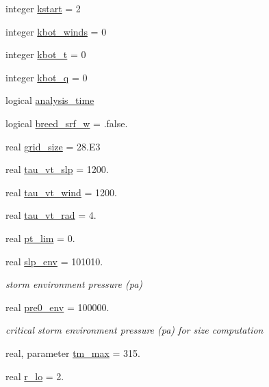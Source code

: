 \begin{DoxyCompactItemize}
integer \hyperlink{classfv__nwp__nudge__mod_ab54932d082a922ed0c64ee023b82cb39}{kstart} = 2
\item 
integer \hyperlink{classfv__nwp__nudge__mod_a827de7924a0a51dfe5fe9f7423ba4945}{kbot\-\_\-winds} = 0
\item 
integer \hyperlink{classfv__nwp__nudge__mod_ad7c03f71ddd83294582e31b20b2b5c2a}{kbot\-\_\-t} = 0
\item 
integer \hyperlink{classfv__nwp__nudge__mod_a74234073b487143a6a2f3fbfb681b78e}{kbot\-\_\-q} = 0
\item 
logical \hyperlink{classfv__nwp__nudge__mod_ad4ade09f973cb7f9027724a6f0dfa3e2}{analysis\-\_\-time}
\item 
logical \hyperlink{classfv__nwp__nudge__mod_abe2b674214dcb600da0917bed138a693}{breed\-\_\-srf\-\_\-w} = .false.
\item 
real \hyperlink{classfv__nwp__nudge__mod_a7cb840172166ac14895fa478c0b600d1}{grid\-\_\-size} = 28.E3
\item 
real \hyperlink{classfv__nwp__nudge__mod_aa233a35074268c39b4e9a7e3304c5266}{tau\-\_\-vt\-\_\-slp} = 1200.
\item 
real \hyperlink{classfv__nwp__nudge__mod_ac55edc6cc6a0dd38808a85de68d359ac}{tau\-\_\-vt\-\_\-wind} = 1200.
\item 
real \hyperlink{classfv__nwp__nudge__mod_aedb6d82b930ca6f0120ef1a1a7103e52}{tau\-\_\-vt\-\_\-rad} = 4.
\item 
real \hyperlink{classfv__nwp__nudge__mod_a865347a5d8e5faa5502349ef5af5712c}{pt\-\_\-lim} = 0.
\item 
real \hyperlink{classfv__nwp__nudge__mod_aeae3cc750d917e17328d4ea8de151d6e}{slp\-\_\-env} = 101010.
\begin{DoxyCompactList}\small\item\em storm environment pressure (pa) \end{DoxyCompactList}\item 
real \hyperlink{classfv__nwp__nudge__mod_a18ccc45a22e3d7fe4ebd33add4819161}{pre0\-\_\-env} = 100000.
\begin{DoxyCompactList}\small\item\em critical storm environment pressure (pa) for size computation \end{DoxyCompactList}\item 
real, parameter \hyperlink{classfv__nwp__nudge__mod_aac08d7ae4a61435471198d904245024a}{tm\-\_\-max} = 315.
\item 
real \hyperlink{classfv__nwp__nudge__mod_ab0d4afa46d379b1dfdfb896cbc99823d}{r\-\_\-lo} = 2.

\end{DoxyCompactItemize}
